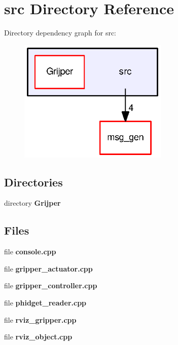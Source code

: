 \section{src Directory Reference}
\label{dir_68267d1309a1af8e8297ef4c3efbcdba}
Directory dependency graph for src\-:\nopagebreak
\begin{figure}[H]
\begin{center}
\leavevmode
\includegraphics[width=202pt]{dir_68267d1309a1af8e8297ef4c3efbcdba_dep}
\end{center}
\end{figure}
\subsection*{Directories}
\begin{DoxyCompactItemize}
\item 
directory {\bf Grijper}
\end{DoxyCompactItemize}
\subsection*{Files}
\begin{DoxyCompactItemize}
\item 
file {\bf console.\-cpp}
\item 
file {\bf gripper\-\_\-actuator.\-cpp}
\item 
file {\bf gripper\-\_\-controller.\-cpp}
\item 
file {\bf phidget\-\_\-reader.\-cpp}
\item 
file {\bf rviz\-\_\-gripper.\-cpp}
\item 
file {\bf rviz\-\_\-object.\-cpp}
\end{DoxyCompactItemize}
